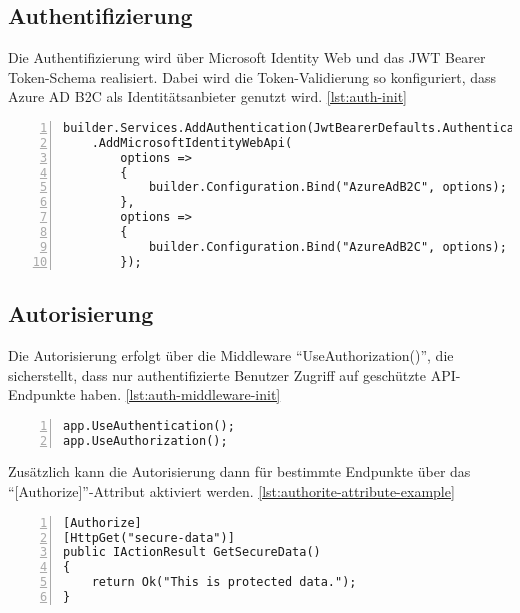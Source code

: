 \subsection{Authentifizierung}

Die Authentifizierung wird über Microsoft Identity Web und das JWT Bearer Token-Schema realisiert. 
Dabei wird die Token-Validierung so konfiguriert, dass Azure AD B2C als Identitätsanbieter 
genutzt wird. \ref{lst:auth-init}

\begin{lstlisting}[numbers=left,caption={Authentifizierung-Initialisierung},label={lst:auth-init}]
builder.Services.AddAuthentication(JwtBearerDefaults.AuthenticationScheme)
    .AddMicrosoftIdentityWebApi(
        options => 
        {
            builder.Configuration.Bind("AzureAdB2C", options);
        },
        options =>
        {
            builder.Configuration.Bind("AzureAdB2C", options);
        });

\end{lstlisting}

\subsection{Autorisierung}

Die Autorisierung erfolgt über die Middleware ``UseAuthorization()'', die sicherstellt, 
dass nur authentifizierte Benutzer Zugriff auf geschützte API-Endpunkte haben. \ref{lst:auth-middleware-init}

\begin{lstlisting}[numbers=left,caption={Autorisierungs Middleware Initialisierung},label={lst:auth-middleware-init}]
app.UseAuthentication();
app.UseAuthorization();    
\end{lstlisting}

Zusätzlich kann die Autorisierung dann für bestimmte Endpunkte über 
das ``[Authorize]''-Attribut aktiviert werden. \ref{lst:authorite-attribute-example}

\begin{lstlisting}[numbers=left,caption={Authorize-Attribut Beispiel},label={lst:authorite-attribute-example}]
[Authorize]
[HttpGet("secure-data")]
public IActionResult GetSecureData()
{
    return Ok("This is protected data.");
}    
\end{lstlisting}

